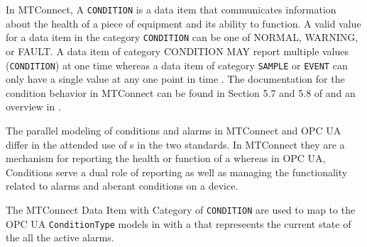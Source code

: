 In MTConnect, A \texttt{CONDITION} is a data item that communicates information about the health of a piece of equipment and its ability to function. A valid value for a data item in the category \texttt{CONDITION} can be one of NORMAL, WARNING, or FAULT.  A data item of category CONDITION MAY report multiple values (\texttt{CONDITION}) at one time whereas a data item of category \texttt{SAMPLE} or \texttt{EVENT} can only have a single value at any one point in time . The documentation for the condition behavior in MTConnect can be found in Section 5.7 and 5.8 of \cite{MTCPart3} and an overview in \cite{MTCPart2}.

The parallel modeling of conditions and alarms in MTConnect and OPC UA differ in the attended use of s in the two standards. In MTConnect they are a mechanism for reporting the health or function of a  whereas in OPC UA, Conditions serve a dual role of reporting as well as managing the functionality related to alarms and aberant conditions on a device.


The MTConnect Data Item with Category of \texttt{CONDITION} are used to map to the OPC UA \texttt{ConditionType} models in \cite{UAPart9} with a  that represeents the current state of the all the active alarms.


